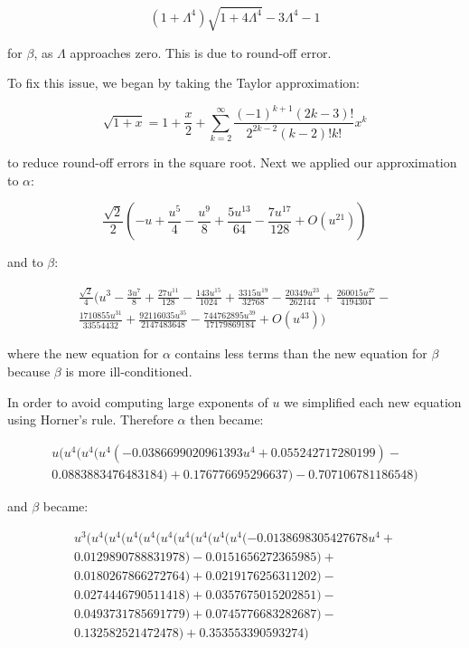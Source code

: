 \documentclass[12pt]{article}
\begin{document}
    \begin{equation}
       (1+\Lambda^4)\sqrt{1+4\Lambda^4} -3\Lambda^4-1
    \end{equation}


for $\beta$, as $\Lambda$ approaches zero. This is due to round-off 
error.\bigskip

To fix this issue, we began by taking the Taylor approximation:

    \begin{equation}
        \sqrt{1+x} = 1 + \frac{x}{2} + \sum_{k=2}^{\infty} 
                    \frac{(-1)^{k+1}(2k-3)!}{2^{2k-2}(k-2)!k!}x^k
    \end{equation} 

to reduce round-off errors in the square root.
\bigskip
Next we applied our approximation to $\alpha$:

    \begin{equation}
        \frac{\sqrt{2}}{2}(-u+\frac{u^5}{4}-\frac{u^9}{8}+
        \frac{5u^{13}}{64}-\frac{7u^{17}}{128}+O(u^{21}))
    \end{equation}

and to $\beta$:

    \begin{multline}
        \frac{\sqrt{2}}{4}(u^3-\frac{3u^7}{8}+\frac{27u^{11}}{128}-
        \frac{143u^{15}}{1024}+\frac{3315u^{19}}{32768} - 
        \frac{20349u^{23}}{262144}+ \frac{260015u^{27}}{4194304} - \\ 
        \frac{1710855u^{31}}{33554432} + 
        \frac{92116035u^{35}}{2147483648} - 
        \frac{744762895u^{39}}{17179869184} + O(u^{43}))
    \end{multline}

where the new equation for $\alpha$ contains less terms than the new
equation for $\beta$ because $\beta$ is more ill-conditioned.\bigskip

In order to avoid computing large exponents of $u$ we simplified each
new equation using Horner's rule. Therefore $\alpha$ then became:

    \begin{multline}
        u(u^4(u^4(u^4(-0.0386699020961393u^4 + 0.055242717280199) - \\ 
        0.0883883476483184) + 0.176776695296637) - 0.707106781186548)
    \end{multline}

and $\beta$ became:

    \begin{multline}
        u^3(u^4(u^4(u^4(u^4(u^4(u^4(u^4(u^4(u^4(-0.0138698305427678u^4 + \\
        0.0129890788831978) - 0.0151656272365985) + \\ 
        0.0180267866272764) + 0.0219176256311202) - \\
        0.0274446790511418) + 0.0357675015202851) - \\
        0.0493731785691779) + 0.0745776683282687) - \\
        0.132582521472478) + 0.353553390593274)
    \end{multline}
\end{document}
